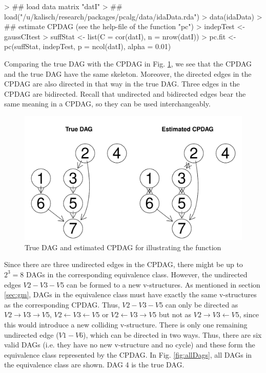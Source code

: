 \documentclass[article]{jss}
\begin{document}
\begin{Schunk}
\begin{Sinput}
> ## load data matrix "datI"
> ## load("/u/kalisch/research/packages/pcalg/data/idaData.rda")
> data(idaData)
> ## estimate CPDAG (see the help-file of the function "pc")
> indepTest <- gaussCItest 
> suffStat <- list(C = cor(datI), n = nrow(datI))
> pc.fit <- pc(suffStat, indepTest, p = ncol(datI), alpha = 0.01)
\end{Sinput}
\end{Schunk}

Comparing the true DAG with the CPDAG in Fig. \ref{fig:ida}, we see that
the CPDAG and the true DAG have the same skeleton. Moreover, the directed
edges in the CPDAG are also directed in that way in the true DAG. Three
edges in the CPDAG are bidirected. Recall that undirected and bidirected
edges bear the same meaning in a CPDAG, so they can be used interchangeably.
\begin{figure}
  \begin{center}
\includegraphics{pcalgDoc-idaExpl2}
\caption{True DAG and estimated CPDAG for illustrating the function }
\label{fig:ida}
\end{center}
\end{figure}

Since there are three undirected edges in the CPDAG, there might be up to
$2^3 = 8$ DAGs in the corresponding equivalence class. However, the
undirected edges $V2-V3-V5$ can be formed to a new v-structures. As
mentioned in section \ref{sec:gm}, DAGs in the equivalence class must have
exactly the same v-structures as the corresponding CPDAG. Thus, $V2-V3-V5$
can only be directed as $V2 \rightarrow V3 \rightarrow V5$, $V2 \leftarrow
V3 \leftarrow V5$ or $V2 \leftarrow V3 \rightarrow V5$ but not as $V2
\rightarrow V3 \leftarrow V5$, since this would introduce a new colliding
v-structure. There is only one remaining undirected edge ($V1-V6$), which
can be directed in two ways. Thus, there are six valid DAGs 
(i.e. they have no new v-structure and no cycle) and these form the
equivalence class represented by the CPDAG. In Fig. \ref{fig:allDags}, all
DAGs in the equivalence class are shown. DAG 4 is the true DAG.
\end{document}
